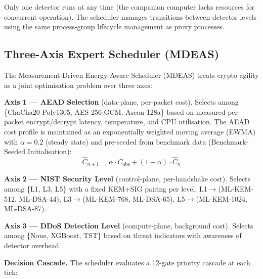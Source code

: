 \documentclass[conference]{IEEEtran}
\begin{document}
Only one detector runs at any time (the companion computer lacks resources for concurrent operation).
The scheduler manages transitions between detector levels using the same process-group lifecycle management as proxy processes.

\subsection{Three-Axis Expert Scheduler (MDEAS)}
\label{sec:scheduler}

The Measurement-Driven Energy-Aware Scheduler (MDEAS) treats crypto agility as a joint optimisation problem over three axes:

\textbf{Axis 1 --- AEAD Selection} (data-plane, per-packet cost).
Selects among \{ChaCha20-Poly1305, AES-256-GCM, Ascon-128a\} based on measured per-packet encrypt/decrypt latency, temperature, and CPU utilisation.
The AEAD cost profile is maintained as an exponentially weighted moving average (EWMA) with $\alpha = 0.2$ (steady state) and pre-seeded from benchmark data (Benchmark-Seeded Initialisation):
\begin{equation}
\label{eq:ewma}
    \hat{C}_{n+1} = \alpha \cdot C_{\mathrm{obs}} + (1 - \alpha) \cdot \hat{C}_{n}
\end{equation}

\textbf{Axis 2 --- NIST Security Level} (control-plane, per-handshake cost).
Selects among \{L1, L3, L5\} with a fixed KEM+SIG pairing per level: L1$\to$(ML-KEM-512, ML-DSA-44), L3$\to$(ML-KEM-768, ML-DSA-65), L5$\to$(ML-KEM-1024, ML-DSA-87).

\textbf{Axis 3 --- DDoS Detection Level} (compute-plane, background cost).
Selects among \{None, XGBoost, TST\} based on threat indicators with awareness of detector overhead.

\textbf{Decision Cascade.}
The scheduler evaluates a 12-gate priority cascade at each tick:
\end{document}
